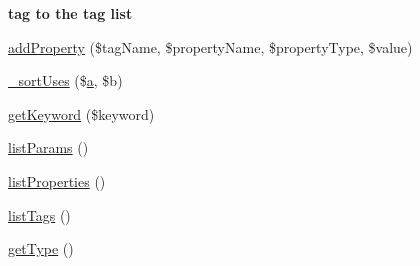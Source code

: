 \begin{Indent}{\bf tag to the tag list}
\begin{DoxyCompactItemize}
\item 
\hyperlink{classparser_doc_block_a47312e1efbc5a2ae540423f49edbbab9}{add\-Property} (\$tag\-Name, \$property\-Name, \$property\-Type, \$value)
\item 
\hyperlink{classparser_doc_block_ac3a208815e7d080a10c1fe8bb8f222ac}{\-\_\-sort\-Uses} (\$\hyperlink{classa}{a}, \$b)
\item 
\hyperlink{classparser_doc_block_ac28fe00afcd1f0f6e15c06febaeff176}{get\-Keyword} (\$keyword)
\item 
\hyperlink{classparser_doc_block_a977b9c1119e70af3b160ea33922b11d8}{list\-Params} ()
\item 
\hyperlink{classparser_doc_block_a9e2fbcc14d6ca4e13490335e7b85d915}{list\-Properties} ()
\item 
\hyperlink{classparser_doc_block_a63e81b6d72f1501c0e4f362397f9a00a}{list\-Tags} ()
\item 
\hyperlink{classparser_doc_block_a830b5c75df72b32396701bc563fbe3c7}{get\-Type} ()
\end{DoxyCompactItemize}
\end{Indent}
